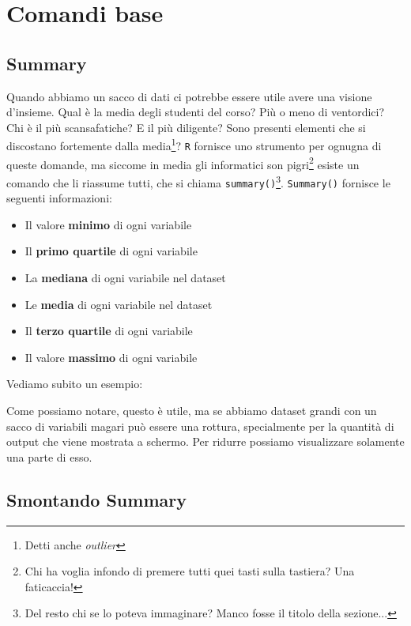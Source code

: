 \chapter{Comandi base}

\section{Summary}

Quando abbiamo un sacco di dati ci potrebbe essere utile avere una visione
d'insieme. Qual è la media degli studenti del corso? Più o meno di ventordici?
Chi è il più scansafatiche? E il più diligente? Sono presenti elementi che si
discostano fortemente dalla media\footnote{Detti anche \textit{outlier}}?
\texttt{R} fornisce uno strumento per ognugna di queste domande, ma siccome in
media gli informatici son pigri\footnote{Chi ha voglia infondo di premere tutti
quei tasti sulla tastiera? Una faticaccia!} esiste un comando che li riassume
tutti, che si chiama \texttt{summary()}\footnote{Del resto chi se lo poteva
immaginare? Manco fosse il titolo della sezione...}. \texttt{Summary()}
fornisce le seguenti informazioni:
\begin{itemize}
 \item Il valore \textbf{minimo} di ogni variabile
 \item Il \textbf{primo quartile} di ogni variabile
 \item La \textbf{mediana} di ogni variabile nel dataset
 \item Le \textbf{media} di ogni variabile nel dataset
 \item Il \textbf{terzo quartile} di ogni variabile
 \item Il valore \textbf{massimo} di ogni variabile
\end{itemize}

Vediamo subito un esempio:



Come possiamo notare, questo è utile, ma se abbiamo dataset grandi con un sacco
di variabili magari può essere una rottura, specialmente per la quantità di
output che viene mostrata a schermo. Per ridurre possiamo visualizzare
solamente una parte di esso.



\section{Smontando Summary}


